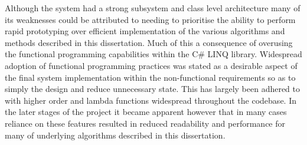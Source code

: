 \noindent
Although the system had a strong subsystem and class level architecture many of its weaknesses could be attributed to needing to prioritise the ability to perform rapid prototyping over efficient implementation of the various algorithms and methods described in this dissertation. Much of this a consequence of overusing the functional programming capabilities within the C\# LINQ library. Widespread adoption of functional programming practices was stated as a desirable aspect of the final system implementation within the non-functional requirements so as to simply the design and reduce unnecessary state. This has largely been adhered to with  higher order and lambda functions widespread throughout the codebase. In the later stages of the project it became apparent however that in many cases reliance on these features resulted in reduced readability and performance for many of underlying algorithms described in this dissertation. 









%
